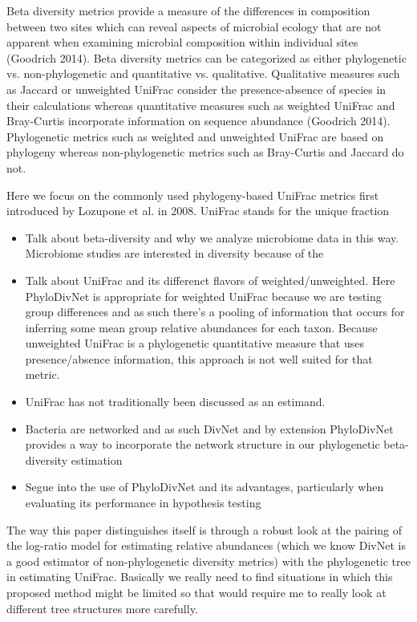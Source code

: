 \documentclass{article}
\begin{document}
Beta diversity metrics provide a measure of the differences in composition between two sites which can reveal aspects of microbial ecology that are not apparent when examining microbial composition within individual sites (Goodrich 2014). Beta diversity metrics can be categorized as either phylogenetic vs. non-phylogenetic and quantitative vs. qualitative. Qualitative measures such as Jaccard or unweighted UniFrac consider the presence-absence of species in their calculations whereas quantitative measures such as weighted UniFrac and Bray-Curtis incorporate information on sequence abundance (Goodrich 2014). Phylogenetic metrics such as weighted and unweighted UniFrac are based on phylogeny whereas non-phylogenetic metrics such as Bray-Curtis and Jaccard do not.

Here we focus on the commonly used phylogeny-based UniFrac metrics first introduced by Lozupone et al. in 2008. UniFrac stands for the unique fraction



\begin{itemize}
\item Talk about beta-diversity and why we analyze microbiome data in this way.
Microbiome studies are interested in diversity because of the
\item Talk about UniFrac and its differenct flavors of weighted/unweighted.
\subitem Here PhyloDivNet is appropriate for weighted UniFrac because we are testing group differences and as such there's a pooling of information that occurs for inferring some mean group relative abundances for each taxon. Because unweighted UniFrac is a phylogenetic quantitative measure that uses presence/absence information, this approach is not well suited for that metric.
\item UniFrac has not traditionally been discussed as an estimand.
\item Bacteria are networked and as such DivNet and by extension PhyloDivNet provides a way to incorporate the network structure in our phylogenetic beta-diversity estimation
\item  Segue into the use of PhyloDivNet and its advantages, particularly when evaluating its performance in hypothesis testing
\end{itemize}

\item The way this paper distinguishes itself is through a robust look at the pairing of the log-ratio model for estimating relative abundances (which we know DivNet is a good estimator of non-phylogenetic diversity metrics) with the phylogenetic tree in estimating UniFrac. Basically we really need to find situations in which this proposed method might be limited so that would require me to really look at different tree structures more carefully.
\end{document}
